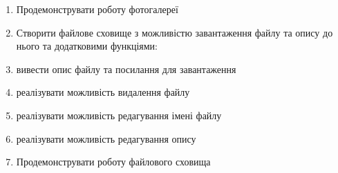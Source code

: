 \begin{enumerate}
\item[]Продемонструвати роботу фотогалереї  
\item[]Створити файлове сховище з можливістю завантаження файлу та опису до нього та додатковими функціями:
\item вивести опис файлу та посилання для завантаження
\item реалізувати можливість видалення файлу
\item реалізувати можливість редагування імені файлу
\item реалізувати можливість редагування опису
\item[]Продемонструвати роботу файлового сховища 
\end{enumerate}

